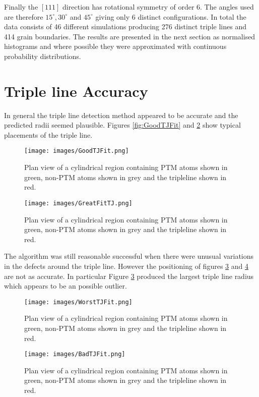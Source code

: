 \documentclass[12pt,a4paper]{book}
\begin{document}
Finally the $[1 1 1]$ direction has rotational symmetry of order 6. The angles used are therefore $15^{\circ},30^{\circ}$  and $45^{\circ}$ giving only 6 distinct configurations. In total the data consists of 46 different simulations producing 276 distinct triple lines and 414 grain boundaries. The results are presented in the next section as normalised histograms and where possible they were approximated with continuous probability distributions.  

\section{Triple line Accuracy}

In general the triple line detection method appeared to be accurate and the predicted radii seemed plausible. Figures  
\ref{fig:GoodTJFit} and \ref{fig:GreatTJFit} show typical placements of the triple line.

\begin{figure}[H]
	\centering
	\texttt{[image: images/GoodTJFit.png]} 
	\label{fig:TJGoodFit}
	\caption{Plan view of a cylindrical region containing PTM atoms shown in green, non-PTM atoms shown in grey and the tripleline shown in red.}
\end{figure}

\begin{figure}[H]
	\centering
	\texttt{[image: images/GreatFitTJ.png]} 
	\label{fig:GreatTJFit}
	\caption{Plan view of a cylindrical region containing PTM atoms shown in green, non-PTM atoms shown in grey and the tripleline shown in red.}
\end{figure}

The algorithm was still reasonable successful when there were unusual variations in the defects around the triple line. However the positioning of figures \ref{fig:WorstTJFit} and  \ref{fig:BadTJFit} are not as accurate. In particular Figure \ref{fig:WorstTJFit} produced the largest triple line radius which appears to be an possible outlier.  

\begin{figure}[H]
	\centering
	\texttt{[image: images/WorstTJFit.png]} 
	\label{fig:WorstTJFit}
	\caption{Plan view of a cylindrical region containing PTM atoms shown in green, non-PTM atoms shown in grey and the tripleline shown in red.}
\end{figure}


\begin{figure}[H]
	\centering
	\texttt{[image: images/BadTJFit.png]} 
	\label{fig:BadTJFit}
	\caption{Plan view of a cylindrical region containing PTM atoms shown in green, non-PTM atoms shown in grey and the tripleline shown in red.}
\end{figure}
\end{document}
